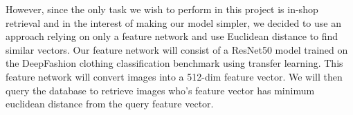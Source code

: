 However, since the only task we wish to perform in this project is in-shop retrieval and in the interest of making our model simpler, we decided to use an approach relying on only a feature network and use Euclidean distance to find similar vectors. Our feature network will consist of a ResNet50 model trained on the DeepFashion clothing classification benchmark using transfer learning. This feature network will convert images into a 512-dim feature vector. We will then query the database to retrieve images who's feature vector has minimum euclidean distance from the query feature vector. 

